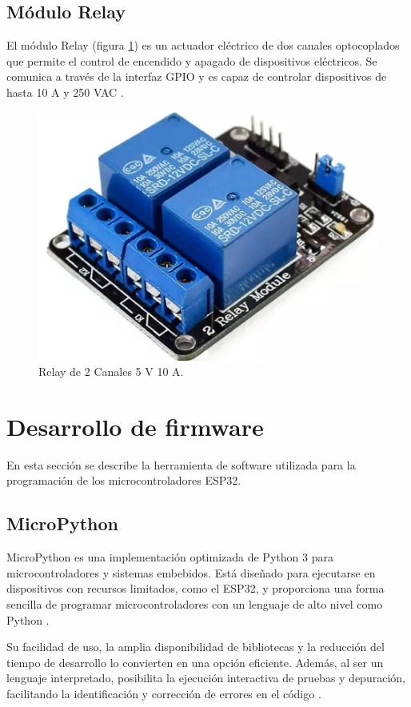 \subsection{Módulo Relay}

El módulo Relay (figura \ref{fig:Relay}) es un actuador eléctrico de dos
canales optocoplados que permite el control de encendido y apagado de
dispositivos eléctricos. Se comunica a través de la interfaz GPIO y es capaz de
controlar dispositivos de hasta 10 A y 250 VAC \cite{Relay}.

\begin{figure}[H]
	\centering
	\includegraphics[height=.15\textwidth]{./Images/13.png}
	\caption{Relay de 2 Canales 5 V 10 A\protect\footnotemark.}
	\label{fig:Relay}
\end{figure}



\section{Desarrollo de firmware}

En esta sección se describe la herramienta de software utilizada para la
programación de los microcontroladores ESP32.

\subsection{MicroPython}

MicroPython es una implementación optimizada de Python 3 para
microcontroladores y sistemas embebidos. Está diseñado para ejecutarse en
dispositivos con recursos limitados, como el ESP32, y proporciona una forma
sencilla de programar microcontroladores con un lenguaje de alto nivel como
Python \cite{MicroPython}.

Su facilidad de uso, la amplia disponibilidad de bibliotecas y la reducción del
tiempo de desarrollo lo convierten en una opción eficiente. Además, al ser un
lenguaje interpretado, posibilita la ejecución interactiva de pruebas y
depuración, facilitando la identificación y corrección de errores en el código
\cite{CTAMicroPython}.

